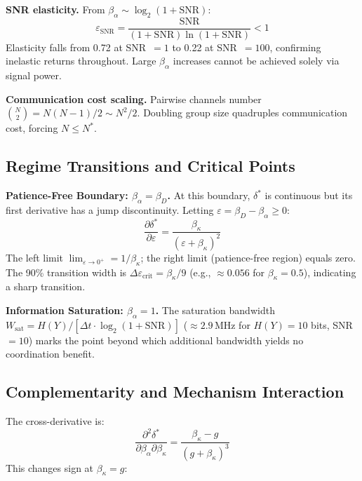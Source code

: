 \documentclass[11pt]{article}
\begin{document}
\textbf{SNR elasticity.} From $\beta_\alpha \sim \log_2(1+\text{SNR})$:
\begin{equation}
\varepsilon_{\text{SNR}} = \frac{\text{SNR}}{(1+\text{SNR}) \ln(1+\text{SNR})} < 1
\end{equation}
Elasticity falls from 0.72 at SNR~$= 1$ to 0.22 at SNR~$= 100$, confirming inelastic returns throughout. Large $\beta_\alpha$ increases cannot be achieved solely via signal power.

\textbf{Communication cost scaling.} Pairwise channels number $\binom{N}{2} = N(N-1)/2 \sim N^2/2$. Doubling group size quadruples communication cost, forcing $N \leq N^*$.

\subsection{Regime Transitions and Critical Points}
\label{sec:S2.7}

\textbf{Patience-Free Boundary: $\beta_\alpha = \beta_D$.} At this boundary, $\delta^*$ is continuous but its first derivative has a jump discontinuity. Letting $\varepsilon = \beta_D - \beta_\alpha \geq 0$:
\begin{equation}
\frac{\partial \delta^*}{\partial \varepsilon} = \frac{\beta_\kappa}{(\varepsilon + \beta_\kappa)^2}
\end{equation}
The left limit $\lim_{\varepsilon \to 0^+} = 1/\beta_\kappa$; the right limit (patience-free region) equals zero. The 90\% transition width is $\Delta\varepsilon_{\text{crit}} = \beta_\kappa/9$ (e.g., $\approx 0.056$ for $\beta_\kappa = 0.5$), indicating a sharp transition.

\textbf{Information Saturation: $\beta_\alpha = 1$.} The saturation bandwidth $W_{\text{sat}} = H(Y)/[\Delta t \cdot \log_2(1+\text{SNR})]$ ($\approx 2.9$\,MHz for $H(Y)=10$ bits, SNR~$=10$) marks the point beyond which additional bandwidth yields no coordination benefit.

\subsection{Complementarity and Mechanism Interaction}
\label{sec:S2.8}

The cross-derivative is:
\begin{equation}
\frac{\partial^2 \delta^*}{\partial \beta_\alpha \partial \beta_\kappa} = \frac{\beta_\kappa - g}{(g + \beta_\kappa)^3}
\end{equation}
This changes sign at $\beta_\kappa = g$:
\end{document}
